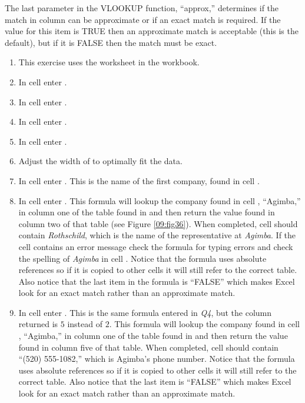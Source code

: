 The last parameter in the VLOOKUP function, ``approx,'' determines if the match in column can be approximate or if an exact match is required. If the value for this item is TRUE then an approximate match is acceptable (this is the default), but if it is FALSE then the match must be exact. 

\begin{enumerate}
	\item This exercise uses the  worksheet in the  workbook.
	\item In cell  enter .
	\item In cell  enter .
	\item In cell  enter .
	\item In cell  enter .
	\item Adjust the width of  to optimally fit the data.
	\item In cell  enter . This is the name of the first company, found in cell .
	\item In cell  enter . This formula will lookup the company found in cell , ``Agimba,'' in column one of the table found in  and then return the value found in column two of that table (see Figure \ref{09:fig36}). When completed, cell  should contain \textit{Rothschild}, which is the name of the representative at \textit{Agimba}. If the cell contains an error message check the formula for typing errors and check the spelling of \textit{Agimba} in cell . Notice that the formula uses absolute references so if it is copied to other cells it will still refer to the correct table. Also notice that the last item in the formula is ``FALSE'' which makes Excel look for an exact match rather than an approximate match.
	\item In cell  enter . This is the same formula entered in \textit{Q4}, but the column returned is $ 5 $ instead of $ 2 $. This formula will lookup the company found in cell , ``Agimba,'' in column one of the table found in  and then return the value found in column five of that table. When completed, cell  should contain ``(520) 555-1082,'' which is Agimba's phone number.  Notice that the formula uses absolute references so if it is copied to other cells it will still refer to the correct table. Also notice that the last item is ``FALSE'' which makes Excel look for an exact match rather than an approximate match.

\end{enumerate}
